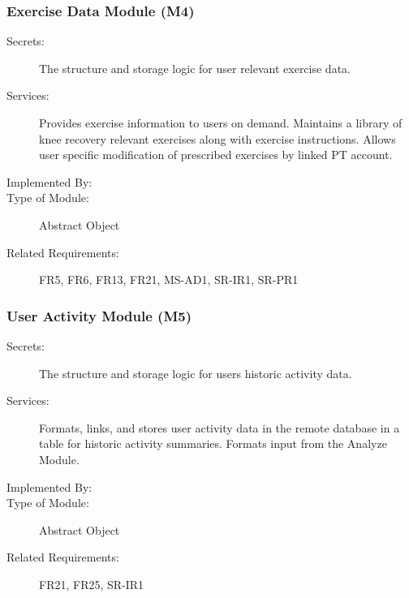 \documentclass[12pt, titlepage]{article}
\begin{document}
\subsubsection{Exercise Data Module (M4)}
\begin{description}
    \item[Secrets:] The structure and storage logic for user relevant exercise data.
    \item[Services:] Provides exercise information to users on demand. Maintains a library of knee recovery relevant exercises along with exercise instructions. Allows user specific modification of prescribed exercises by linked PT account.
    \item[Implemented By:] \progname{}
    \item[Type of Module:] Abstract Object
    \item[Related Requirements:] FR5, FR6, FR13, FR21, MS-AD1, SR-IR1, SR-PR1
\end{description}

\subsubsection{User Activity Module (M5)}
\begin{description}
    \item[Secrets:] The structure and storage logic for users historic activity data.
    \item[Services:] Formats, links, and stores user activity data in the remote database in a table for historic activity summaries. Formats input from the Analyze Module.
    \item[Implemented By:] \progname{}
    \item[Type of Module:] Abstract Object
    \item[Related Requirements:] FR21, FR25, SR-IR1
\end{description}
\end{document}

